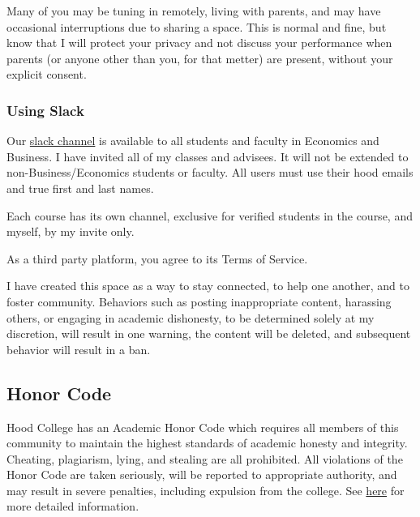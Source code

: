 \documentclass{article}
\begin{document}
Many of you may be tuning in remotely, living with parents, and may have
occasional interruptions due to sharing a space. This is normal and
fine, but know that I will protect your privacy and not discuss your
performance when parents (or anyone other than you, for that metter) are
present, without your explicit consent.

\hypertarget{using-slack}{%
\subsubsection*{Using Slack}\label{using-slack}}

Our \href{https://hoodcollegeeconomics.slack.com}{slack channel} is
available to all students and faculty in Economics and Business. I have
invited all of my classes and advisees. It will not be extended to
non-Business/Economics students or faculty. All users must use their
hood emails and true first and last names.

Each course has its own channel, exclusive for verified students in the
course, and myself, by my invite only.

As a third party platform, you agree to its Terms of Service.

I have created this space as a way to stay connected, to help one
another, and to foster community. Behaviors such as posting
inappropriate content, harassing others, or engaging in academic
dishonesty, to be determined solely at my discretion, will result in one
warning, the content will be deleted, and subsequent behavior will
result in a ban.

\hypertarget{honor-code}{%
\subsection*{Honor Code}\label{honor-code}}

Hood College has an Academic Honor Code which requires all members of
this community to maintain the highest standards of academic honesty and
integrity. Cheating, plagiarism, lying, and stealing are all prohibited.
All violations of the Honor Code are taken seriously, will be reported
to appropriate authority, and may result in severe penalties, including
expulsion from the college. See
\href{http://hood.smartcatalogiq.com/en/2016-2017/Catalog/The-Spirit-of-Hood/The-Academic-Honor-Code-and-Code-of-Conduct}{here}
for more detailed information.
\end{document}
